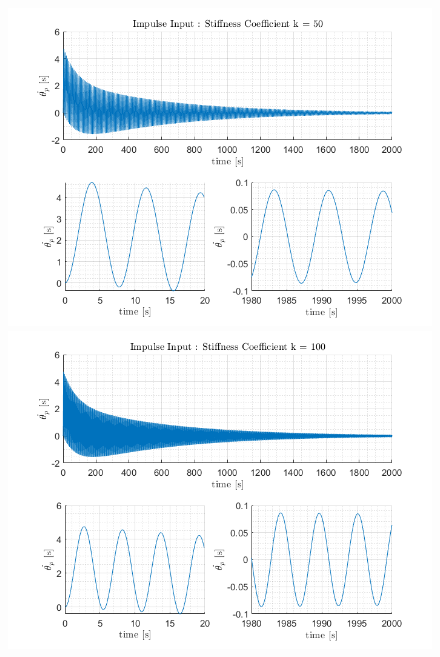 \documentclass[letterpaper,12pt]{article}
\begin{document}
\begin{figure}[ht]
    \centering
    \includegraphics[scale = .8]{Images/Impulse_k50.png}
    \includegraphics[scale = .8]{Images/Impulse_k100.png}
\end{figure}
\end{document}
